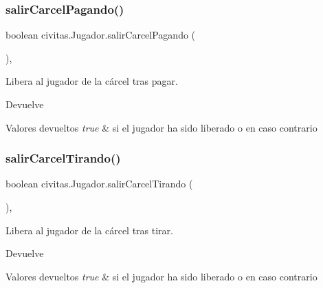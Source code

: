 \subsubsection{\texorpdfstring{salir\+Carcel\+Pagando()}{salirCarcelPagando()}}
{\footnotesize\ttfamily boolean civitas.\+Jugador.\+salir\+Carcel\+Pagando (\begin{DoxyParamCaption}{ }\end{DoxyParamCaption})\hspace{0.3cm}{\ttfamily [inline]}, {\ttfamily [package]}}

Libera al jugador de la cárcel tras pagar. \begin{DoxyReturn}{Devuelve}

\end{DoxyReturn}

\begin{DoxyRetVals}{Valores devueltos}
{\em true} & si el jugador ha sido liberado o  en caso contrario \\
\hline
\end{DoxyRetVals}
\mbox{\label{classcivitas_1_1Jugador_a2c4106981ddfb43872df3303685739c1}} 
\subsubsection{\texorpdfstring{salir\+Carcel\+Tirando()}{salirCarcelTirando()}}
{\footnotesize\ttfamily boolean civitas.\+Jugador.\+salir\+Carcel\+Tirando (\begin{DoxyParamCaption}{ }\end{DoxyParamCaption})\hspace{0.3cm}{\ttfamily [inline]}, {\ttfamily [package]}}

Libera al jugador de la cárcel tras tirar. \begin{DoxyReturn}{Devuelve}

\end{DoxyReturn}

\begin{DoxyRetVals}{Valores devueltos}
{\em true} & si el jugador ha sido liberado o  en caso contrario \\
\hline
\end{DoxyRetVals}
\mbox{\label{classcivitas_1_1Jugador_a076d9059f63b0176becea3c15dc98493}} 
